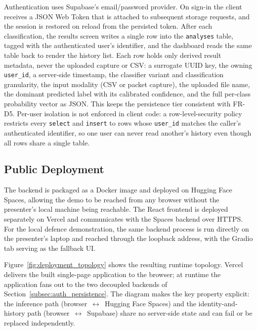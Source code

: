 \par Authentication uses Supabase's email/password provider. On sign-in the client receives a JSON Web Token that is attached to subsequent storage requests, and the session is restored on reload from the persisted token. After each classification, the results screen writes a single row into the \texttt{analyses} table, tagged with the authenticated user's identifier, and the dashboard reads the same table back to render the history list. Each row holds only derived result metadata, never the uploaded capture or CSV: a surrogate UUID key, the owning \texttt{user\_id}, a server-side timestamp, the classifier variant and classification granularity, the input modality (CSV or packet capture), the uploaded file name, the dominant predicted label with its calibrated confidence, and the full per-class probability vector as JSON. This keeps the persistence tier consistent with FR-D5. Per-user isolation is not enforced in client code: a row-level-security policy restricts every \texttt{select} and \texttt{insert} to rows whose \texttt{user\_id} matches the caller's authenticated identifier, so one user can never read another's history even though all rows share a single table.

\subsection{Public Deployment}
\label{subsec:public_deployment}

\par The backend is packaged as a Docker image and deployed on Hugging Face Spaces, allowing the demo to be reached from any browser without the presenter's local machine being reachable. The React frontend is deployed separately on Vercel and communicates with the Spaces backend over HTTPS. For the local defence demonstration, the same backend process is run directly on the presenter's laptop and reached through the loopback address, with the Gradio tab serving as the fallback UI.

\par Figure~\ref{fig:deployment_topology} shows the resulting runtime topology. Vercel delivers the built single-page application to the browser; at runtime the application fans out to the two decoupled backends of Section~\ref{subsec:auth_persistence}. The diagram makes the key property explicit: the inference path (browser~$\leftrightarrow$~Hugging Face Spaces) and the identity-and-history path (browser~$\leftrightarrow$~Supabase) share no server-side state and can fail or be replaced independently.

